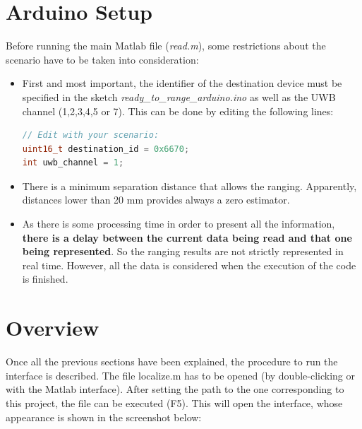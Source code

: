\documentclass[a4paper, 21pt]{article} %
\begin{document}
\section{Arduino Setup}\label{se:arduino}
Before running the main Matlab file (\textit{read.m}), some restrictions about the scenario have to be taken into consideration:
\begin{itemize}
\item First and most important, the identifier of the destination device must be specified in the sketch \textit{ready\_to\_range\_arduino.ino} as well as the UWB channel (1,2,3,4,5 or 7). This can be done by editing the following lines:
\begin{lstlisting}[language=c, breaklines=true, commentstyle=\color{blue}, basicstyle=\ttfamily\small]
// Edit with your scenario:
uint16_t destination_id = 0x6670;     
int uwb_channel = 1;
\end{lstlisting}
\item There is a minimum separation distance that allows the ranging. Apparently, distances lower than 20 mm provides always a zero estimator.
\item As there is some processing time in order to present all the information, \textbf{there is a delay between the current data being read and that one being represented}. So the ranging results are not strictly represented in real time. However, all the data is considered when the execution of the code is finished.
\end{itemize}

\section{Overview}
Once all the previous sections have been explained, the procedure to run the interface is described. The file localize.m has to be opened (by double-clicking or with the Matlab interface). After setting the path to the one corresponding to this project, the file can be executed (F5). This will open the interface, whose appearance is shown in the screenshot below:\\
\end{document}
